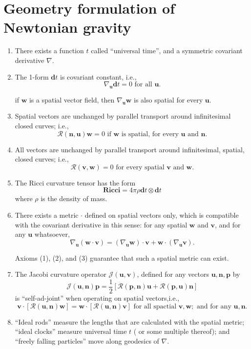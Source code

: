 \section{Geometry formulation of Newtonian gravity}
\begin{enumerate}
\item There exists a function $t$ called ``universal time'', and a symmetric covariant derivative $\nabla$.
\item The 1-form $\bm{d}t$ is covariant constant, i.e.,
\[\nabla_{\bm{u}} \bm{d}t = 0  \mbox{ for all } \bm{u}.\]
\begin{note}
if $\bm{w}$ is a spatial vector field, then $\nabla_{\bm{u}}\bm{w}$ is also spatial for every $\bm{u}$.
\end{note}
\item Spatial vectors are unchanged by parallel transport around infinitesimal closed curves; i.e.,
\[\mathcal{R}(\bm{n},\bm{u}) \bm{w}=0 \mbox{ if }\bm{w}\mbox{ is spatial, for every } \bm{u} \mbox{ and } \bm{n}.\]
\item All vectors are unchanged by parallel transport around infinitesimal, spatial, closed curves; i.e.,
\[\mathcal{R}(\bm{v},\bm{w}) =0 \mbox{ for every spatial }\bm{v} \mbox{ and } \bm{w}.\]
\item The Ricci curvature tensor has the form
\[\bm{Ricci} = 4 \pi \rho \bm{d}t \otimes \bm{d}t\]
where $\rho$ is the density of mass.
\item There exists a metric $\bm{\cdot}$ defined on spatial vectors only, which is compatible with the covariant derivative in this sense: for any spatial $\bm{w}$ and $\bm{v}$, and for any $\bm{u}$ whatsoever,
\[\nabla_{\bm{u}}(\bm{w} \cdot \bm{v}) = (\nabla_{\bm{u}} \bm{w}) \cdot \bm{v} + \bm{w} \cdot (\nabla_{\bm{u}} \bm{v}).\]
\begin{note}
Axioms (1), (2), and (3) guarantee that such a spatial metric can exist.
\end{note}
\item The Jacobi curvature operator $\mathcal{J}(\bm{u},\bm{v})$, defined for any vectors $\bm{u},\bm{n},\bm{p}$ by
\[\mathcal{J}(\bm{u},\bm{n})\bm{p} = \frac{1}{2}[\mathcal{R}(\bm{p},\bm{n})\bm{u} + \mathcal{R}(\bm{p},\bm{u})\bm{n}]\]
is ``self-ad-joint'' when operating on spatial vectors,i.e.,
\[\bm{v} \cdot [\mathcal{R}(\bm{u},\bm{n})\bm{w}] = 
\bm{w} \cdot [\mathcal{R}(\bm{u},\bm{n})\bm{v}] \mbox{ for all spactial }\bm{v},\bm{w};\mbox{ and for any }\bm{u},\bm{n}. \]
\item ``Ideal rods'' measure the lengths that are calculated with the spatial metric; ``ideal clocks'' measure universal time $t$ ( or some multiple thereof); and ``freely falling particles'' move along geodesics of $\nabla$.
\end{enumerate}

